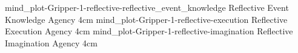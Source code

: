 {\experimentcausegroupplots{\dataappendixmaxtime}
                           {\dataappendixexperimentonemaxtime}
                           {\dataappendixexperimenttwomaxtime}
                           {\dataappendixexperimentthreemaxtime}
                           {\dataappendixexperimentonename}
                           {\dataappendixexperimenttwoname}
                           {\dataappendixexperimentthreename}
                           {\dataappendixexperimentoneprettyname}
                           {\dataappendixexperimenttwoprettyname}
                           \experimentcausegroupplotscontinued{\dataappendixexperimentthreeprettyname}
                                                              {mind_plot-Gripper-1-reflective-reflective_event_knowledge}
                                                              {Reflective Event Knowledge Agency}
                                                              {\experimentdatacommontablereference}
                                                              {4cm}}
{\experimentcausegroupplots{\dataappendixmaxtime}
                           {\dataappendixexperimentonemaxtime}
                           {\dataappendixexperimenttwomaxtime}
                           {\dataappendixexperimentthreemaxtime}
                           {\dataappendixexperimentonename}
                           {\dataappendixexperimenttwoname}
                           {\dataappendixexperimentthreename}
                           {\dataappendixexperimentoneprettyname}
                           {\dataappendixexperimenttwoprettyname}
                           \experimentcausegroupplotscontinued{\dataappendixexperimentthreeprettyname}
                                                              {mind_plot-Gripper-1-reflective-execution}
                                                              {Reflective Execution Agency}
                                                              {\experimentdatacommontablereference}
                                                              {4cm}}
{\experimentcausegroupplots{\dataappendixmaxtime}
                           {\dataappendixexperimentonemaxtime}
                           {\dataappendixexperimenttwomaxtime}
                           {\dataappendixexperimentthreemaxtime}
                           {\dataappendixexperimentonename}
                           {\dataappendixexperimenttwoname}
                           {\dataappendixexperimentthreename}
                           {\dataappendixexperimentoneprettyname}
                           {\dataappendixexperimenttwoprettyname}
                           \experimentcausegroupplotscontinued{\dataappendixexperimentthreeprettyname}
                                                              {mind_plot-Gripper-1-reflective-imagination}
                                                              {Reflective Imagination Agency}
                                                              {\experimentdatacommontablereference}
                                                              {4cm}}
